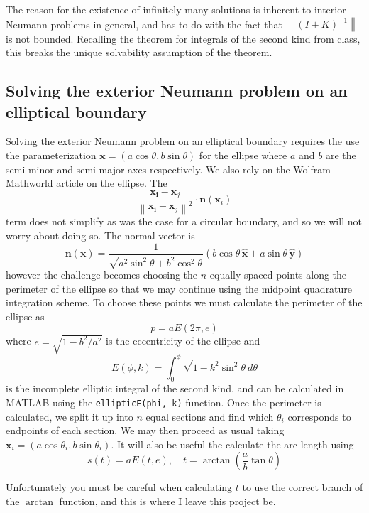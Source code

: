 \documentclass[11pt]{article}
\newcommand{\norm}[1]{\left\lVert#1\right\rVert}
\begin{document}
The reason for the existence of infinitely many solutions is inherent to interior Neumann problems in general, and has to do with the fact that $\norm{(I+K)^{-1}}$ is not bounded. Recalling the theorem for integrals of the second kind from class, this breaks the unique solvability assumption of the theorem.

\subsection{Solving the exterior Neumann problem on an elliptical boundary}
Solving the exterior Neumann problem on an elliptical boundary requires the use the parameterization $\bm{x} = (a\cos\theta, b\sin\theta)$ for the ellipse where $a$ and $b$ are the semi-minor and semi-major axes respectively. We also rely on the Wolfram Mathworld article on the ellipse. The
\begin{equation*}
\frac{\bm{x_i}-\bm{x}_j}{\norm{\bm{x_i}-\bm{x}_j}^2} \cdot \bm{n}(\bm{x}_i)
\end{equation*}
term does not simplify as was the case for a circular boundary, and so we will not worry about doing so. The normal vector is
\begin{equation*}
	\bm{n}(\bm{x}) = \frac{1}{\sqrt{a^2\sin^2\theta + b^2\cos^2\theta}} (b\cos\theta \, \hat{\bm{x}} + a\sin\theta \, \hat{\bm{y}} )
\end{equation*}
however the challenge becomes choosing the $n$ equally spaced points along the perimeter of the ellipse so that we may continue using the midpoint quadrature integration scheme. To choose these points we must calculate the perimeter of the ellipse as
\begin{equation*}
	p = aE(2\pi, e)
\end{equation*}
where $e = \sqrt{1 - b^2/a^2}$ is the eccentricity of the ellipse and
\begin{equation}
	E(\phi,k) = \int_0^\phi \sqrt{1 - k^2\sin^2\theta} \, d\theta
\end{equation}
is the incomplete elliptic integral of the second kind, and can be calculated in MATLAB using the \texttt{ellipticE(phi, k)} function. Once the perimeter is calculated, we split it up into $n$ equal sections and find which $\theta_i$ corresponds to endpoints of each section. We may then proceed as usual taking $\bm{x}_i = (a\cos\theta_i, b\sin\theta_i)$. It will also be useful the calculate the arc length using
\begin{equation*}
	s(t) = aE(t,e) , \quad t = \arctan \left(\frac{a}{b} \tan\theta \right)
\end{equation*}

Unfortunately you must be careful when calculating $t$ to use the correct branch of the $\arctan$ function, and this is where I leave this project be.
\end{document}
